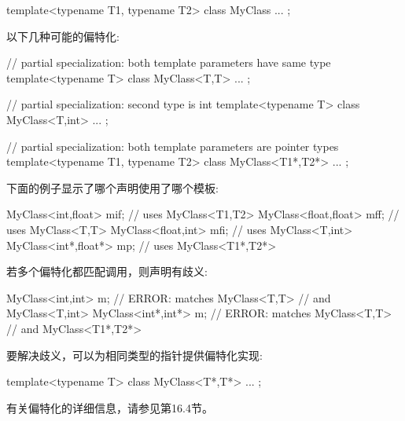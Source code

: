 \begin{cpp}
template<typename T1, typename T2>
class MyClass {
	...
};
\end{cpp}

以下几种可能的偏特化:

\begin{cpp}
// partial specialization: both template parameters have same type
template<typename T>
class MyClass<T,T> {
	...
};

// partial specialization: second type is int
template<typename T>
class MyClass<T,int> {
	...
};

// partial specialization: both template parameters are pointer types
template<typename T1, typename T2>
class MyClass<T1*,T2*> {
	...
};
\end{cpp}

下面的例子显示了哪个声明使用了哪个模板:

\begin{cpp}
MyClass<int,float> mif; // uses MyClass<T1,T2>
MyClass<float,float> mff; // uses MyClass<T,T>
MyClass<float,int> mfi; // uses MyClass<T,int>
MyClass<int*,float*> mp; // uses MyClass<T1*,T2*>
\end{cpp}

若多个偏特化都匹配调用，则声明有歧义:

\begin{cpp}
MyClass<int,int> m; // ERROR: matches MyClass<T,T>
					// and MyClass<T,int>
MyClass<int*,int*> m; // ERROR: matches MyClass<T,T>
					  // and MyClass<T1*,T2*>
\end{cpp}

要解决歧义，可以为相同类型的指针提供偏特化实现:

\begin{cpp}
template<typename T>
class MyClass<T*,T*> {
	...
};
\end{cpp}

有关偏特化的详细信息，请参见第16.4节。






